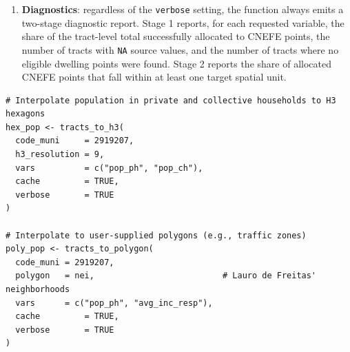 \begin{table}
\centering
\caption{\label{tab:tab-alloc}Allocation rules applied during dasymetric interpolation. \texttt{n\_dom\_p} and \texttt{n\_dom\_c} are counts of matched type-1 and type-2 CNEFE dwelling points per census tract.}
\centering
{}
\end{table}

\begin{enumerate}
\def\labelenumi{\arabic{enumi}.}
\setcounter{enumi}{6}
\tightlist
\item
  \textbf{Diagnostics}: regardless of the \texttt{verbose} setting, the function
  always emits a two-stage diagnostic report. Stage 1 reports, for
  each requested variable, the share of the tract-level total
  successfully allocated to CNEFE points, the number of tracts with
  \texttt{NA} source values, and the number of tracts where no eligible
  dwelling points were found. Stage 2 reports the share of allocated
  CNEFE points that fall within at least one target spatial unit.
\end{enumerate}

\begin{verbatim}
# Interpolate population in private and collective households to H3 hexagons
hex_pop <- tracts_to_h3(
  code_muni     = 2919207,
  h3_resolution = 9,
  vars          = c("pop_ph", "pop_ch"),
  cache         = TRUE,
  verbose       = TRUE
)

# Interpolate to user-supplied polygons (e.g., traffic zones)
poly_pop <- tracts_to_polygon(
  code_muni = 2919207,
  polygon   = nei,                          # Lauro de Freitas' neighborhoods 
  vars      = c("pop_ph", "avg_inc_resp"),
  cache         = TRUE,
  verbose       = TRUE
)
\end{verbatim}

